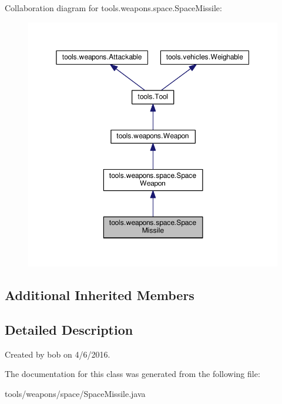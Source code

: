 Collaboration diagram for tools.\+weapons.\+space.\+Space\+Missile\+:
\nopagebreak
\begin{figure}[H]
\begin{center}
\leavevmode
\includegraphics[width=350pt]{classtools_1_1weapons_1_1space_1_1_space_missile__coll__graph}
\end{center}
\end{figure}
\subsection*{Additional Inherited Members}


\subsection{Detailed Description}
Created by bob on 4/6/2016. 

The documentation for this class was generated from the following file\+:\begin{DoxyCompactItemize}
\item 
tools/weapons/space/Space\+Missile.\+java\end{DoxyCompactItemize}
